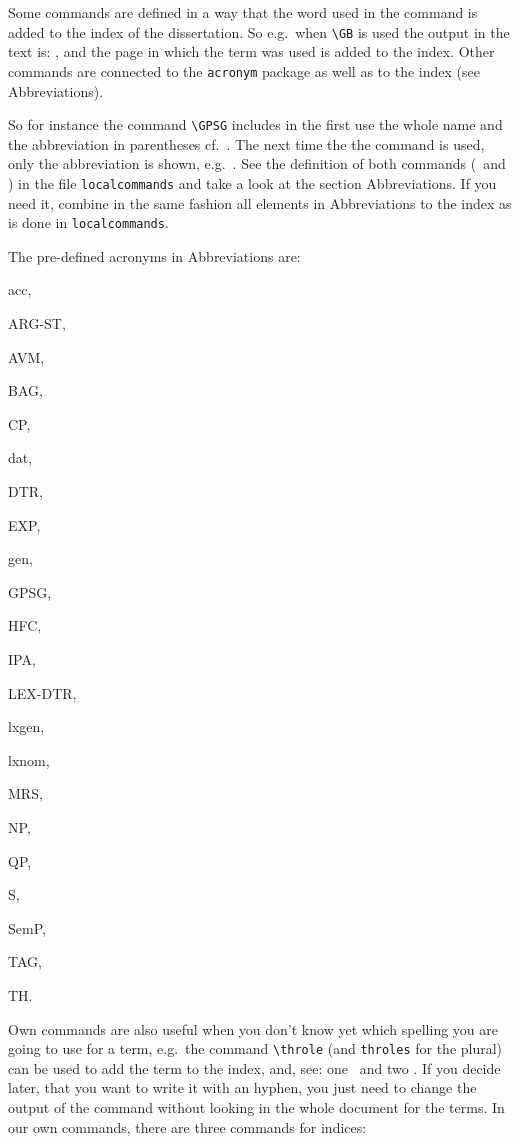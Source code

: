 Some commands are defined in a way that the word used in the command is added to the index of the dissertation. So e.g.\ when \verb|\GB| is used the output in the text is: \GB , and the page in which the term was used is added to the index.  Other commands are connected to the \texttt{acronym} package as well as to the index (see Abbreviations). 


So for instance the command \verb|\GPSG| includes in the first use the whole name and the abbreviation in parentheses cf.\ \GPSG . The next time the the command is used, only the abbreviation is shown, e.g.\ \GPSG . See the definition of both commands (\GB\ and \GPSG ) in the file \texttt{localcommands} and take a look at the section Abbreviations. If you need it, combine in the same fashion all elements in Abbreviations to the index as is done in \texttt{localcommands}.


The pre-defined acronyms in Abbreviations are: 
\begin{multicols}{2}

\begin{itemize*}
\item \ac{acc}, 
\item \ac{ARG-ST}, 
\item \ac{AVM},  
\item \ac{BAG}, 
\item \ac{CP}, 
\item \ac{dat}, 
\item \ac{DTR}, 
\item \ac{EXP}, 
\item \ac{gen}, 
\item \ac{GPSG}, 
\item \ac{HFC}, 
\item \ac{IPA}, 
\item \ac{LEX-DTR}, 
\item \ac{lxgen},  
\item \ac{lxnom}, 
\item \ac{MRS}, 
\item \ac{NP}, 
\item \ac{QP}, 
\item \ac{S}, 
\item \ac{SemP}, 
\item \ac{TAG}, 
\item \ac{TH}. 
\end{itemize*}

\end{multicols}

Own commands are also useful when you don't know yet which spelling you are going to use for a term, e.g.\ the command \verb|\throle| (and \verb|throles| for the plural) can be used to add the term to the index, and, see: one \throle\ and two \throles . If you decide later, that you want to write it with an hyphen, you just need to change the output of the command without looking in the whole document for the terms. In our own commands, there are three commands for indices:

